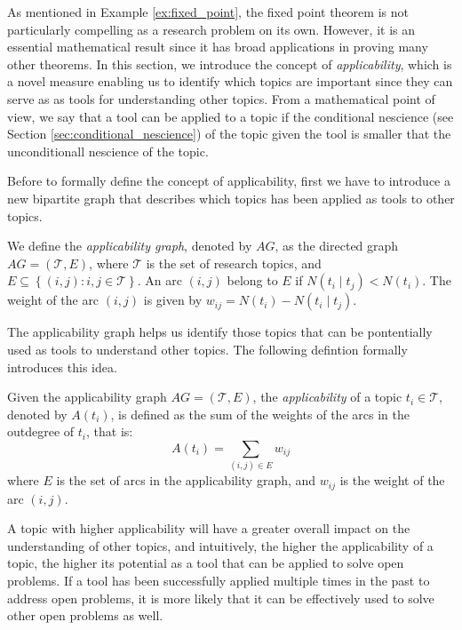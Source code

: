 As mentioned in Example \ref{ex:fixed_point}, the fixed point theorem is not particularly compelling as a research problem on its own. However, it is an essential mathematical result since it has broad applications in proving many other theorems. In this section, we introduce the concept of \emph{applicability}, which is a novel measure enabling us to identify which topics are important since they can serve as as tools for understanding other topics. From a mathematical point of view, we say that a tool can be applied to a topic if the conditional nescience (see Section \ref{sec:conditional_nescience}) of the topic given the tool is smaller that the unconditionall nescience of the topic.

Before to formally define the concept of applicability, first we have to introduce a new bipartite graph that describes which topics has been applied as tools to other topics.

\begin{definition}
\label{def:applicability-graph}
We define the \emph{applicability graph}, denoted by $AG$, as the directed graph $AG = (\mathcal{T}, E)$, where $\mathcal{T}$ is the set of research topics, and $E\subseteq\left\{ (i,j):i,j\in \mathcal{T} \right\} $. An arc $(i, j)$ belong to $E$ if $N \left( t_i \mid t_j \right) < N \left( t_i \right)$. The weight of the arc $(i, j)$ is given by $w_{ij} = N \left( t_i \right) - N \left( t_i \mid t_j \right)$.
\end{definition}

The applicability graph helps us identify those topics that can be pontentially used as tools to understand other topics. The following defintion formally introduces this idea.

\begin{definition}
\label{def:applicability}
Given the applicability graph $AG = (\mathcal{T}, E)$, the \emph{applicability} of a topic $t_i \in \mathcal{T}$, denoted by $A(t_i)$, is defined as the sum of the weights of the arcs in the outdegree of $t_i$, that is:
\[
A(t_i) = \sum_{(i, j) \in E} w_{ij}
\]
where $E$ is the set of arcs in the applicability graph, and $w_{ij}$ is the weight of the arc $(i, j)$.
\end{definition}

A topic with higher applicability will have a greater overall impact on the understanding of other topics, and intuitively, the higher the applicability of a topic, the higher its potential as a tool that can be applied to solve open problems. If a tool has been successfully applied multiple times in the past to address open problems, it is more likely that it can be effectively used to solve other open problems as well.

